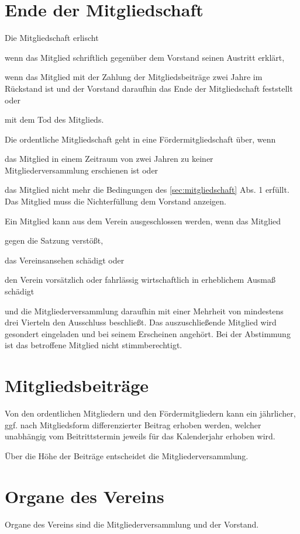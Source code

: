 \section{Ende der Mitgliedschaft}\label{sec:ende_der_mitgliedschaft}
\begin{absätze}
    \item Die Mitgliedschaft erlischt
    \begin{sätze}
        \item wenn das Mitglied schriftlich gegenüber dem Vorstand seinen Austritt erklärt,
        \item wenn das Mitglied mit der Zahlung der Mitgliedsbeiträge zwei Jahre im Rückstand ist und der Vorstand daraufhin das Ende der Mitgliedschaft feststellt oder
        \item mit dem Tod des Mitglieds.
    \end{sätze}
    \item Die ordentliche Mitgliedschaft geht in eine Fördermitgliedschaft über, wenn
    \begin{sätze}
        \item das Mitglied in einem Zeitraum von zwei Jahren zu keiner Mitgliederversammlung erschienen ist oder
        \item das Mitglied nicht mehr die Bedingungen des \ref{sec:mitgliedschaft} Abs. 1 erfüllt. Das Mitglied muss die Nichterfüllung dem Vorstand anzeigen.
    \end{sätze}
    \item Ein Mitglied kann aus dem Verein ausgeschlossen werden, wenn das Mitglied
    \begin{sätze}
        \item gegen die Satzung verstößt,
        \item das Vereinsansehen schädigt oder
        \item den Verein vorsätzlich oder fahrlässig wirtschaftlich in erheblichem Ausmaß schädigt
    \end{sätze}
    und die Mitgliederversammlung daraufhin mit einer Mehrheit von mindestens drei Vierteln den Ausschluss beschließt. Das auszuschließende Mitglied wird gesondert eingeladen und bei seinem Erscheinen angehört. Bei der Abstimmung ist das betroffene Mitglied nicht stimmberechtigt.
	\end{absätze}

\section{Mitgliedsbeiträge}
	\begin{absätze}
		\item Von den ordentlichen Mitgliedern und den Fördermitgliedern kann ein jährlicher, ggf. nach Mitgliedsform differenzierter Beitrag erhoben werden, welcher unabhängig vom Beitrittstermin jeweils für das Kalenderjahr erhoben wird.
		\item Über die Höhe der Beiträge entscheidet die Mitgliederversammlung.
	\end{absätze}

\section{Organe des Vereins}
    Organe des Vereins sind die Mitgliederversammlung und der Vorstand.
